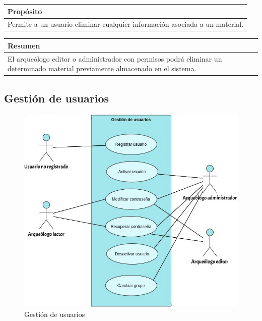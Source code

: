     \begin{table}[H]
        \centering
        \begin{tabularx}{\textwidth}{@{} |L |@{}} \hline
            \textbf{Propósito} \\
            \hline
            Permite a un usuario eliminar cualquier información asociada a un material. \\
            \hline
        \end{tabularx}
    \end{table}

    \begin{table}[H]
        \centering
        \begin{tabularx}{\textwidth}{@{} |L |@{}} \hline
            \textbf{Resumen} \\
            \hline
            El arqueólogo editor o administrador con permisos podrá eliminar un determinado
            material previamente almacenado en el sistema. \\
            \hline
        \end{tabularx}
    \end{table}

\subsection{Gestión de usuarios}
    \begin{figure}[H]
        \centering
        \includegraphics[scale=0.50]{imagenes/diagramas CU/user-UC.png}
        \caption{Gestión de usuarios}
        \label{fig:user-management}
    \end{figure}

